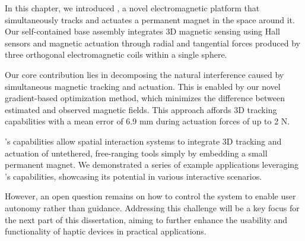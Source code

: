 
In this chapter, we introduced \omniUIST, a novel electromagnetic platform that simultaneously tracks and actuates a permanent magnet in the space around it. Our self-contained base assembly integrates 3D magnetic sensing using Hall sensors and magnetic actuation through radial and tangential forces produced by three orthogonal electromagnetic coils within a single sphere.

Our core contribution lies in decomposing the natural interference caused by simultaneous magnetic tracking and actuation. This is enabled by our novel gradient-based optimization method, which minimizes the difference between estimated and observed magnetic fields. This approach affords 3D tracking capabilities with a mean error of 6.9 mm during actuation forces of up to 2 N.

\omniUIST's capabilities allow spatial interaction systems to integrate 3D tracking and actuation of untethered, free-ranging tools simply by embedding a small permanent magnet. We demonstrated a series of example applications leveraging \omniUIST's capabilities, showcasing its potential in various interactive scenarios.

However, an open question remains on how to control the system to enable user autonomy rather than guidance. Addressing this challenge will be a key focus for the next part of this dissertation, aiming to further enhance the usability and functionality of haptic devices in practical applications.
